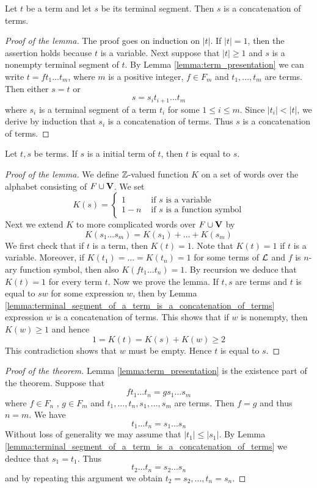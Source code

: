 \begin{lemma}\label{lemma:terminal_segment_of_a_term_is_a_concatenation_of_terms}
Let $t$ be a term and let $s$ be its terminal segment. Then $s$ is a concatenation of terms.
\end{lemma}
\begin{proof}[Proof of the lemma]
The proof goes on induction on $|t|$. If $|t| = 1$, then the assertion holds because $t$ is a variable. Next suppose that $|t| \geq 1$ and $s$ is a nonempty terminal segment of $t$. By Lemma \ref{lemma:term_presentation} we can write $t = ft_1...t_m$, where $m$ is a positive integer, $f \in F_m$ and $t_1,...,t_m$ are terms. Then
either $s = t$ or
$$s = s_it_{i+1}...t_m$$
where $s_i$ is a terminal segment of a term $t_i$ for some $1 \leq i \leq m$. Since $|t_i|<|t|$, we derive by induction that $s_i$ is a concatenation of terms. Thus $s$ is a concatenation of terms.
\end{proof}

\begin{lemma}
Let $t,s$ be terms. If $s$ is a initial term of $t$, then $t$ is equal to $s$.
\end{lemma}
\begin{proof}[Proof of the lemma]
We define ${\mathbb Z}$-valued function $K$ on a set of words over the alphabet consisting of $F \cup \mathbf{V}$. We set
$$K(s) =\begin{cases}1 & \mbox{ if }s\mbox{ is a variable}\\
1-n & \mbox{ if }s\mbox{ is a function symbol}
\end{cases}$$
Next we extend $K$ to more complicated words over $F \cup \mathbf{V}$ by
$$K(s_1 ...s_m) = K(s_1) + ... + K(s_m)$$
We first check that if $t$ is a term, then $K(t) = 1$. Note that $K(t) = 1$ if $t$ is a variable. Moreover, if $K(t_1) = ... = K(t_n) = 1$ for some terms of ${\mathcal L}$ and $f$ is $n$-ary function symbol, then also $K( ft_1...t_n) = 1$.
By recursion we deduce that $K(t) = 1$ for every term $t$. Now we prove the lemma. If $t, s$ are terms and $t$ is equal to $sw$ for some expression $w$, then by Lemma \ref{lemma:terminal_segment_of_a_term_is_a_concatenation_of_terms} expression $w$ is a concatenation of terms. This shows that if $w$ is nonempty, then $K(w) \geq 1$ and hence
$$1 = K(t) = K(s) + K(w) \geq 2$$
This contradiction shows that $w$ must be empty. Hence $t$ is equal to $s$.
\end{proof}

\begin{proof}[Proof of the theorem]
Lemma \ref{lemma:term_presentation} is the existence part of the theorem. Suppose that
$$ft_1 ...t_n = gs_1 ...s_m$$
where $f \in F_n$ , $g \in F_m$ and $t_1, ..., t_n , s_1 , ..., s_m$ are terms. Then $f = g$ and thus $n = m$. We have
$$t_1 ...t_n = s_1 ...s_n$$
Without loss of generality we may assume that $|t_1| \leq |s_1|$. By Lemma \ref{lemma:terminal_segment_of_a_term_is_a_concatenation_of_terms} we deduce that $s_1 = t_1$.
Thus
$$t_2 ...t_n = s_2 ...s_n$$
and by repeating this argument we obtain $t_2 = s_2 ,...,t_n = s_n$.
\end{proof}
 
